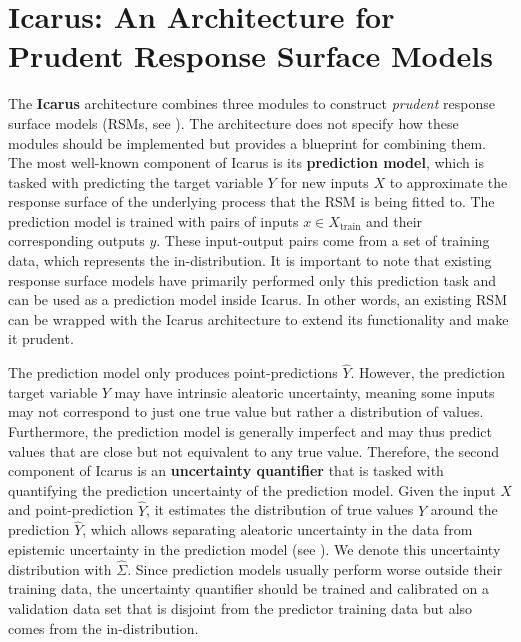 \section{Icarus: An Architecture for Prudent Response Surface Models} \label{txt:icarus-rsm}

The \textbf{Icarus} architecture combines three modules to construct \textit{prudent} response surface models (RSMs, see ). The architecture does not specify how these modules should be implemented but provides a blueprint for combining them. The most well-known component of Icarus is its \textcolor{icarus-prediction}{\textbf{prediction model}}, which is tasked with predicting the target variable $Y$ for new inputs $X$ to approximate the response surface of the underlying process that the RSM is being fitted to. The prediction model is trained with pairs of inputs $x \in X_{\text{train}}$ and their corresponding outputs $y$. These input-output pairs come from a set of training data, which represents the in-distribution. It is important to note that existing response surface models have primarily performed only this prediction task and can be used as a prediction model inside Icarus. In other words, an existing RSM can be wrapped with the Icarus architecture to extend its functionality and make it prudent.

The prediction model only produces point-predictions \textcolor{icarus-prediction}{$\hat{Y}$}. However, the prediction target variable $Y$ may have intrinsic aleatoric uncertainty, meaning some inputs may not correspond to just one true value but rather a distribution of values. Furthermore, the prediction model is generally imperfect and may thus predict values that are close but not equivalent to any true value. Therefore, the second component of Icarus is an \textcolor{icarus-uncertainty}{\textbf{uncertainty quantifier}} that is tasked with quantifying the prediction uncertainty of the prediction model. Given the input $X$ and point-prediction \textcolor{icarus-prediction}{$\hat{Y}$}, it estimates the distribution of true values $Y$ around the prediction \textcolor{icarus-prediction}{$\hat{Y}$}, which allows separating aleatoric uncertainty in the data from epistemic uncertainty in the prediction model (see ). We denote this uncertainty distribution with \textcolor{icarus-uncertainty}{$\hat{\Sigma}$}. Since prediction models usually perform worse outside their training data, the uncertainty quantifier should be trained and calibrated on a validation data set that is disjoint from the predictor training data but also comes from the in-distribution.

